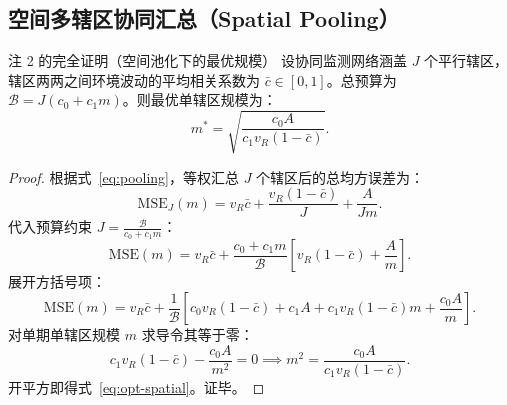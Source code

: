 \subsection{空间多辖区协同汇总（Spatial Pooling）}

\begin{theorembox}{注 2 的完全证明（空间池化下的最优规模）}
设协同监测网络涵盖 $J$ 个平行辖区，辖区两两之间环境波动的平均相关系数为 $\bar{c} \in [0, 1]$。总预算为 $\mathcal{B} = J(c_0 + c_1 m)$。则最优单辖区规模为：
\begin{equation}
  m^* = \sqrt{\frac{c_0 A}{c_1 v_R (1 - \bar{c})}}.
  \label{eq:opt-spatial}
\end{equation}
\end{theorembox}

\begin{proof}
根据式~\eqref{eq:pooling}，等权汇总 $J$ 个辖区后的总均方误差为：
\begin{equation}
  \text{MSE}_J(m) = v_R \bar{c} + \frac{v_R(1 - \bar{c})}{J} + \frac{A}{Jm}.
  \label{eq:pooling}
\end{equation}
代入预算约束 $J = \frac{\mathcal{B}}{c_0 + c_1 m}$：
\begin{equation}
  \text{MSE}(m) = v_R \bar{c} + \frac{c_0 + c_1 m}{\mathcal{B}} \left[ v_R(1 - \bar{c}) + \frac{A}{m} \right].
\end{equation}
展开方括号项：
\begin{equation}
  \text{MSE}(m) = v_R \bar{c} + \frac{1}{\mathcal{B}} \left[ c_0 v_R(1-\bar{c}) + c_1 A + c_1 v_R(1-\bar{c})m + \frac{c_0 A}{m} \right].
\end{equation}
对单期单辖区规模 $m$ 求导令其等于零：
\begin{equation}
  c_1 v_R (1 - \bar{c}) - \frac{c_0 A}{m^2} = 0 \implies m^2 = \frac{c_0 A}{c_1 v_R (1 - \bar{c})}.
\end{equation}
开平方即得式~\eqref{eq:opt-spatial}。证毕。
\end{proof}
